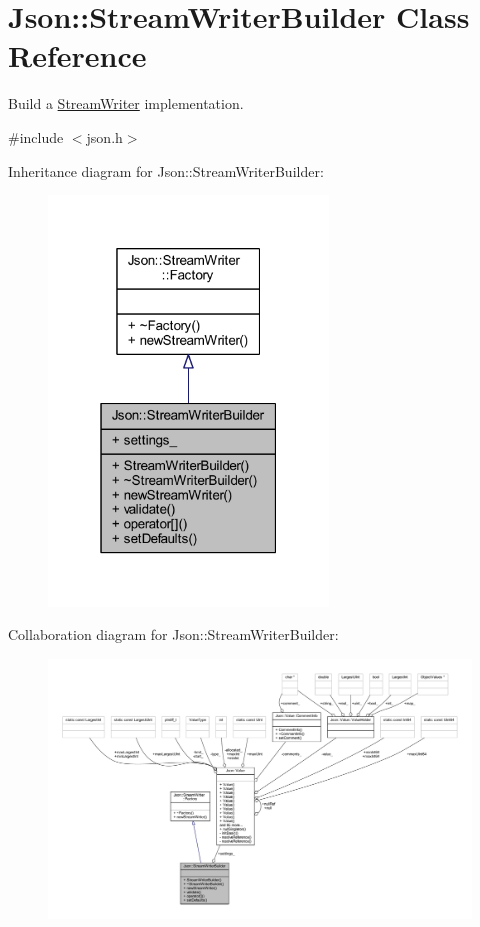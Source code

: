 \hypertarget{class_json_1_1_stream_writer_builder}{}\section{Json\+:\+:Stream\+Writer\+Builder Class Reference}
\label{class_json_1_1_stream_writer_builder}


Build a \hyperlink{class_json_1_1_stream_writer}{Stream\+Writer} implementation.  




{\ttfamily \#include $<$json.\+h$>$}



Inheritance diagram for Json\+:\+:Stream\+Writer\+Builder\+:\nopagebreak
\begin{figure}[H]
\begin{center}
\leavevmode
\includegraphics[width=211pt]{class_json_1_1_stream_writer_builder__inherit__graph}
\end{center}
\end{figure}


Collaboration diagram for Json\+:\+:Stream\+Writer\+Builder\+:\nopagebreak
\begin{figure}[H]
\begin{center}
\leavevmode
\includegraphics[width=350pt]{class_json_1_1_stream_writer_builder__coll__graph}
\end{center}
\end{figure}

